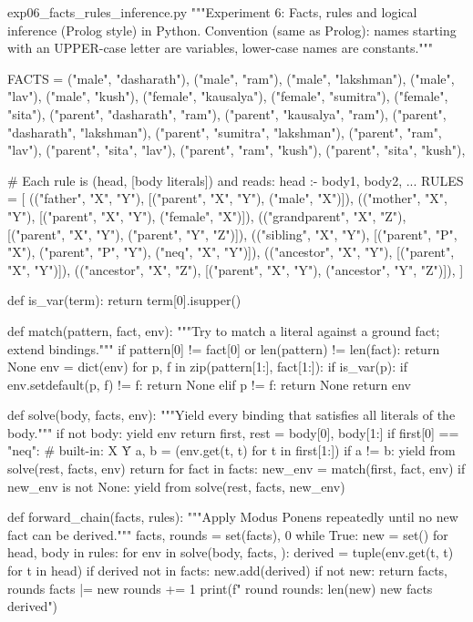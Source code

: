 \documentclass[11pt,a4paper]{article}
\begin{document}
\begin{pycode}{exp06\_facts\_rules\_inference.py}
"""Experiment 6: Facts, rules and logical inference (Prolog style) in Python.
Convention (same as Prolog): names starting with an UPPER-case letter are
variables, lower-case names are constants."""

FACTS = {
    ("male", "dasharath"), ("male", "ram"), ("male", "lakshman"),
    ("male", "lav"), ("male", "kush"),
    ("female", "kausalya"), ("female", "sumitra"), ("female", "sita"),
    ("parent", "dasharath", "ram"), ("parent", "kausalya", "ram"),
    ("parent", "dasharath", "lakshman"), ("parent", "sumitra", "lakshman"),
    ("parent", "ram", "lav"), ("parent", "sita", "lav"),
    ("parent", "ram", "kush"), ("parent", "sita", "kush"),
}

# Each rule is (head, [body literals]) and reads:  head :- body1, body2, ...
RULES = [
    (("father", "X", "Y"), [("parent", "X", "Y"), ("male", "X")]),
    (("mother", "X", "Y"), [("parent", "X", "Y"), ("female", "X")]),
    (("grandparent", "X", "Z"), [("parent", "X", "Y"), ("parent", "Y", "Z")]),
    (("sibling", "X", "Y"), [("parent", "P", "X"), ("parent", "P", "Y"),
                             ("neq", "X", "Y")]),
    (("ancestor", "X", "Y"), [("parent", "X", "Y")]),
    (("ancestor", "X", "Z"), [("parent", "X", "Y"), ("ancestor", "Y", "Z")]),
]


def is_var(term):
    return term[0].isupper()


def match(pattern, fact, env):
    """Try to match a literal against a ground fact; extend bindings."""
    if pattern[0] != fact[0] or len(pattern) != len(fact):
        return None
    env = dict(env)
    for p, f in zip(pattern[1:], fact[1:]):
        if is_var(p):
            if env.setdefault(p, f) != f:
                return None
        elif p != f:
            return None
    return env


def solve(body, facts, env):
    """Yield every binding that satisfies all literals of the body."""
    if not body:
        yield env
        return
    first, rest = body[0], body[1:]
    if first[0] == "neq":                       # built-in: X \= Y
        a, b = (env.get(t, t) for t in first[1:])
        if a != b:
            yield from solve(rest, facts, env)
        return
    for fact in facts:
        new_env = match(first, fact, env)
        if new_env is not None:
            yield from solve(rest, facts, new_env)


def forward_chain(facts, rules):
    """Apply Modus Ponens repeatedly until no new fact can be derived."""
    facts, rounds = set(facts), 0
    while True:
        new = set()
        for head, body in rules:
            for env in solve(body, facts, {}):
                derived = tuple(env.get(t, t) for t in head)
                if derived not in facts:
                    new.add(derived)
        if not new:
            return facts, rounds
        facts |= new
        rounds += 1
        print(f"   round {rounds}: {len(new)} new facts derived")



\end{pycode}
\end{document}
